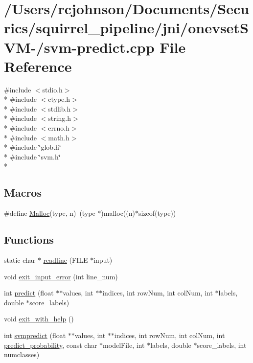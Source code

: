 \hypertarget{_2svm-predict_8cpp}{\section{/\-Users/rcjohnson/\-Documents/\-Securics/squirrel\-\_\-pipeline/jni/onevset\-S\-V\-M-\//svm-\/predict.cpp File Reference}
\label{_2svm-predict_8cpp}
}
{\ttfamily \#include $<$stdio.\-h$>$}\\*
{\ttfamily \#include $<$ctype.\-h$>$}\\*
{\ttfamily \#include $<$stdlib.\-h$>$}\\*
{\ttfamily \#include $<$string.\-h$>$}\\*
{\ttfamily \#include $<$errno.\-h$>$}\\*
{\ttfamily \#include $<$math.\-h$>$}\\*
{\ttfamily \#include \char`\"{}glob.\-h\char`\"{}}\\*
{\ttfamily \#include \char`\"{}svm.\-h\char`\"{}}\\*
\subsection*{Macros}
\begin{DoxyCompactItemize}
\item 
\#define \hyperlink{_2svm-predict_8cpp_a9191047fd644a5f519152ecb4aa60357}{Malloc}(type, n)~(type $\ast$)malloc((n)$\ast$sizeof(type))
\end{DoxyCompactItemize}
\subsection*{Functions}
\begin{DoxyCompactItemize}
\item 
static char $\ast$ \hyperlink{_2svm-predict_8cpp_aa324656b7bb4eb3ee42699d33c21ef7a}{readline} (F\-I\-L\-E $\ast$input)
\item 
void \hyperlink{_2svm-predict_8cpp_ada0be431a4ed2ba4b1a09d4449f2c75b}{exit\-\_\-input\-\_\-error} (int line\-\_\-num)
\item 
int \hyperlink{_2svm-predict_8cpp_ae6ecfcdf838de45a1c4e65c6341d0bfa}{predict} (float $\ast$$\ast$values, int $\ast$$\ast$indices, int row\-Num, int col\-Num, int $\ast$labels, double $\ast$score\-\_\-labels)
\item 
void \hyperlink{_2svm-predict_8cpp_a8bbbfc2cd5ea26b69d3b880c6f509e93}{exit\-\_\-with\-\_\-help} ()
\item 
int \hyperlink{_2svm-predict_8cpp_aca788894c462e86397220c8180009a98}{svmpredict} (float $\ast$$\ast$values, int $\ast$$\ast$indices, int row\-Num, int col\-Num, int \hyperlink{_2svm-predict_8cpp_a1501132f5226b295e5300d74da55a2b9}{predict\-\_\-probability}, const char $\ast$model\-File, int $\ast$labels, double $\ast$score\-\_\-labels, int numclasses)
\end{DoxyCompactItemize}
